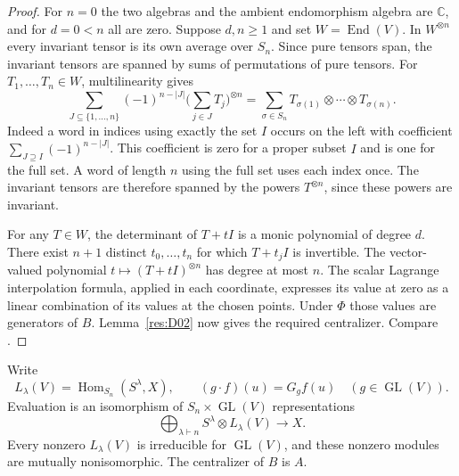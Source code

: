 \begin{proof}
For \(n=0\) the two algebras and the ambient endomorphism algebra
are \(\mathbb C\), and for \(d=0<n\) all are zero. Suppose \(d,n\geq1\)
and set \(W=\operatorname{End}(V)\). In \(W^{\otimes n}\) every
invariant tensor is its own average over \(S_n\). Since pure
tensors span, the invariant tensors are spanned by sums of
permutations of pure tensors. For \(T_1,\ldots,T_n\in W\),
multilinearity gives
\begin{equation*}
 \sum_{J\subseteq\{1,\ldots,n\}} (-1)^{n-|J|}
      \biggl(\sum_{j\in J}T_j\biggr)^{\otimes n}
  =\sum_{\sigma\in S_n}
         T_{\sigma(1)}\otimes\cdots\otimes T_{\sigma(n)} .
\end{equation*}
Indeed a word in indices using exactly the set \(I\) occurs on the
left with coefficient \(\sum_{J\supseteq I}(-1)^{n-|J|}\).
This coefficient is zero for a proper subset \(I\) and is one for
the full set. A word of length \(n\) using the full set uses each
index once. The invariant tensors are therefore spanned by the
powers \(T^{\otimes n}\), since these powers are invariant.

For any \(T\in W\), the determinant of \(T+tI\) is a monic
polynomial of degree \(d\). There exist \(n+1\) distinct
\(t_0,\ldots,t_n\) for which \(T+t_jI\) is invertible.
The vector-valued polynomial \(t\mapsto(T+tI)^{\otimes n}\)
has degree at most \(n\). The scalar Lagrange interpolation
formula, applied in each coordinate, expresses its value at
zero as a linear combination of its values at the chosen
points. Under \(\Phi\) those values are generators of \(B\).
Lemma~\ref{res:D02} now gives the required centralizer.
Compare \cite[Lemma 4.56 and Proposition 4.58]{etingof}.
\end{proof}

\begin{theorem}
\label{res:D04}
Write
\[
 L_\lambda(V)=\operatorname{Hom}_{S_n}(S^\lambda,X),
 \qquad (g\cdot f)(u)=G_g f(u)
 \quad (g\in\operatorname{GL}(V)).
\]
Evaluation is an isomorphism of \(S_n\times\operatorname{GL}(V)\)
representations
\[
 \bigoplus_{\lambda\vdash n} S^\lambda\otimes L_\lambda(V)
        \longrightarrow X .
\]
Every nonzero \(L_\lambda(V)\) is irreducible for
\(\operatorname{GL}(V)\), and these nonzero modules are mutually
nonisomorphic. The centralizer of \(B\) is \(A\).
\end{theorem}

